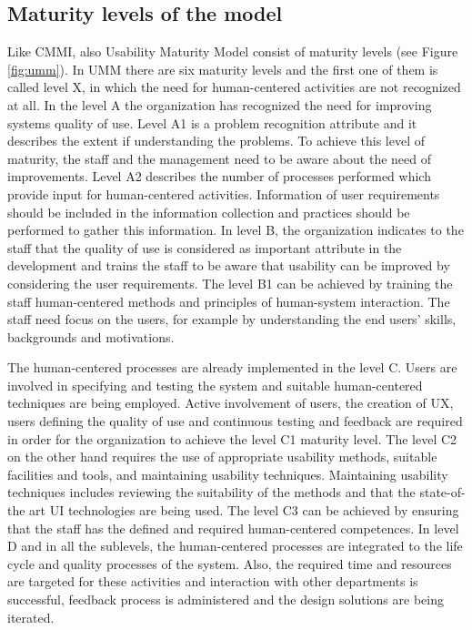 \documentclass[12pt,a4paper,oneside,pdftex]{report}
\begin{document}
 \subsection{Maturity levels of the model}
Like CMMI, also Usability Maturity Model consist of maturity levels (see Figure \ref{fig:umm}). In UMM there are six maturity levels and the first one of them is called level X, in which the need for human-centered activities are not recognized at all. In the level A the organization has recognized the need for improving systems quality of use. Level A1 is a problem recognition attribute and it describes the extent if understanding the problems. To achieve this level of maturity, the staff and the management need to be aware about the need of improvements. Level A2 describes the number of processes performed which provide input for human-centered activities. Information of user requirements should be included in the information collection and practices should be performed to gather this information. In level B, the organization indicates to the staff that the quality of use is considered as important attribute in the development and trains the staff to be aware that usability can be improved by considering the user requirements. The level B1 can be achieved by training the staff human-centered methods and principles of human-system interaction. The staff need focus on the users, for example by understanding the end users' skills, backgrounds and motivations. \cite{RefWorks:30}

The human-centered processes are already implemented in the level C. Users are involved in specifying and testing the system and suitable human-centered techniques are being employed. Active involvement of users, the creation of UX, users defining the quality of use and continuous testing and feedback are required in order for the organization to achieve the level C1 maturity level. The level C2 on the other hand requires the use of appropriate usability methods, suitable facilities and tools, and maintaining usability techniques. Maintaining usability techniques includes reviewing the suitability of the methods and that the state-of-the  art UI technologies are being used. The level C3 can be achieved by ensuring that the staff has the defined and required human-centered competences. In level D and in all the sublevels, the human-centered processes are integrated to the life cycle and quality processes of the system. Also, the required time and resources are targeted for these activities and interaction with other departments is successful, feedback process is administered and the design solutions are being iterated. \cite{RefWorks:30}
\end{document}
